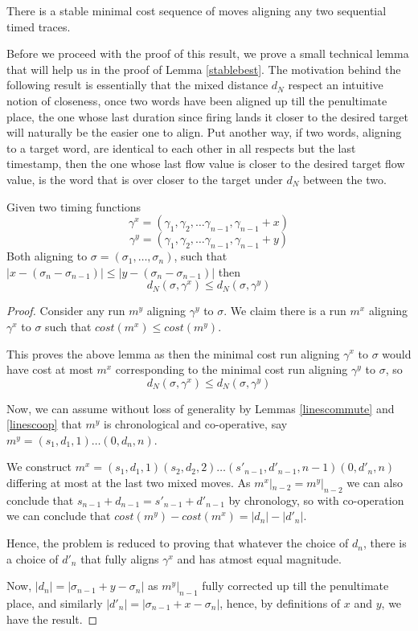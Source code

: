 \documentclass[runningheads]{llncs}
\begin{document}
    \begin{lemma}\label{stablebest} There is a stable minimal cost sequence of moves aligning any two sequential timed traces. 
    \end{lemma}

    Before we proceed with the proof of this result, we prove a small technical lemma that will help us in the proof of Lemma \ref{stablebest}. The motivation behind the following result is essentially that the mixed distance $d_N$ respect an intuitive notion of closeness, once two words have been aligned up till the penultimate place, the one whose last duration since firing lands it closer to the desired target will naturally be the easier one to align. 
Put another way, if two words, aligning to a target word, are identical to each other in all respects but the last timestamp, then the one whose last flow value is closer to the desired target flow value, is the word that is over closer to the target under $d_N$ between the two. 

\begin{lemma}\label{cooplast}
Given two timing functions $$\gamma^x = (\gamma_1, \gamma_2, \dots \gamma_{n-1}, \gamma_{n-1} + x)$$ $$\gamma^y = (\gamma_1, \gamma_2, \dots \gamma_{n-1}, \gamma_{n-1} + y)$$ Both aligning to $\sigma = (\sigma_1, \dots, \sigma_n)$, such that $|x - (\sigma_n - \sigma_{n-1})| \leq |y - (\sigma_n - \sigma_{n-1})|$ then $$d_N(\sigma, \gamma^x) \leq d_N(\sigma, \gamma^y)$$ 
\end{lemma}

\begin{proof}
Consider any run $m^y$ aligning $\gamma^y$ to $\sigma$. 
We claim there is a run $m^x$ aligning $\gamma^x$ to $\sigma$ such that $cost(m^x) \leq cost(m^y)$. 

This proves the above lemma as then the minimal cost run aligning $\gamma^x$ to $\sigma$ would have cost at most $m^x$ corresponding to the minimal cost run aligning $\gamma^y$ to $\sigma$, so $$d_N(\sigma, \gamma^x) \leq d_N(\sigma, \gamma^y)$$

Now, we can assume without loss of generality by Lemmas \ref{linescommute} and \ref{linescoop}  that $m^y$ is chronological and co-operative, say $m^y = (s_1, d_1, 1) \dots (0, d_n, n)$. 

We construct $m^x = (s_1, d_1, 1)(s_2, d_2, 2)\dots (s'_{n-1}, d'_{n-1}, n-1)(0, d'_n, n)$ differing at most at the last two mixed moves. 
As $m^x|_{n-2} = m^y|_{n-2}$ we can also conclude that $s_{n-1} + d_{n-1} = s'_{n-1} + d'_{n-1}$ by chronology, so with co-operation we can conclude that $cost(m^y) - cost(m^x) = |d_n| - |d'_n|$. 

Hence, the problem is reduced to proving that whatever the choice of $d_n$, there is a choice of $d'_n$ that fully aligns $\gamma^x$ and has atmost equal magnitude. 

Now, $|d_n| = |\sigma_{n-1} + y - \sigma_n|$ as $m^y|_{n-1}$ fully corrected up till the penultimate place, and similarly $|d'_n| = |\sigma_{n-1} + x - \sigma_n|$, hence, by definitions of $x$ and $y$, we have the result. 

\end{proof}
\end{document}
